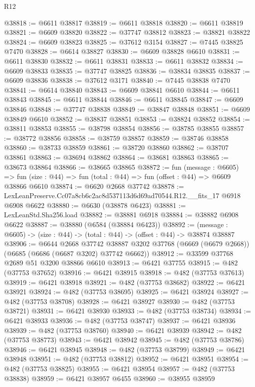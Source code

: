 \begin{lexlean}{R12}
\begin{coremodule}
@38818 := @6611 @38817
@38819 := @6611 @38818
@38820 := @6611 @38819
@38821 := @6609 @38820
@38822 := @37747 @38812
@38823 := @38821 @38822
@38824 := @6609 @38823
@38825 := @37612 @3154
@38827 := @7445 @38825 @7470
@38828 := @6614 @38827
@38830 := @6609 @38828 @6610
@38831 := @6611 @38830
@38832 := @6611 @38831
@38833 := @6611 @38832
@38834 := @6609 @38833
@38835 := @37747 @38825
@38836 := @38834 @38835
@38837 := @6609 @38836
@38838 := @37612 @3171
@38840 := @7445 @38838 @7470
@38841 := @6614 @38840
@38843 := @6609 @38841 @6610
@38844 := @6611 @38843
@38845 := @6611 @38844
@38846 := @6611 @38845
@38847 := @6609 @38846
@38848 := @37747 @38838
@38849 := @38847 @38848
@38851 := @6609 @38849 @6610
@38852 := @38837 @38851
@38853 := @38824 @38852
@38854 := @38811 @38853
@38855 := @38798 @38854
@38856 := @38785 @38855
@38857 := @38772 @38856
@38858 := @38759 @38857
@38859 := @38746 @38858
@38860 := @38733 @38859
@38861 := @38720 @38860
@38862 := @38707 @38861
@38863 := @38694 @38862
@38864 := @38681 @38863
@38865 := @38673 @38864
@38866 := @38665 @38865
@38872 := fun (message : @6605) =>
  fun (size : @44) => fun (total : @44) => fun (offset : @44) => @6609 @38866 @6610
@38874 := @6620 @2668 @37742
@38878 := LexLeanPreserve.Cc07a8cb6c2ac8d537113d6d69ad70544.R12.__fits_17 @6918 @6908 @6622
@38880 := @6630 (@38878 @6423)
@38881 := LexLeanStd.Sha256.load
@38882 := @38881 @6918
@38884 := @38882 @6908 @6622
@38887 := @38880 (@6584 (@38884 @6423))
@38892 := (message : @6605) -> (size : @44) -> (total : @44) -> (offset : @44) -> @38874 @38887
@38906 := @6644
    @2668
    @37742
    @38887
    @3202
    @37768
    (@6669 (@6679 @2668))
    (@6685 (@6686 (@6687 @3202) @37742 @6662))
@38912 := @33599 @37768 @2689 @51 @3200 @38866 @6610
@38913 := @6421 @37755
@38915 := @482 (@37753 @37652)
@38916 := @6421 @38915
@38918 := @482 (@37753 @37613)
@38919 := @6421 @38918
@38921 := @482 (@37753 @38682)
@38922 := @6421 @38921
@38924 := @482 (@37753 @38695)
@38925 := @6421 @38924
@38927 := @482 (@37753 @38708)
@38928 := @6421 @38927
@38930 := @482 (@37753 @38721)
@38931 := @6421 @38930
@38933 := @482 (@37753 @38734)
@38934 := @6421 @38933
@38936 := @482 (@37753 @38747)
@38937 := @6421 @38936
@38939 := @482 (@37753 @38760)
@38940 := @6421 @38939
@38942 := @482 (@37753 @38773)
@38943 := @6421 @38942
@38945 := @482 (@37753 @38786)
@38946 := @6421 @38945
@38948 := @482 (@37753 @38799)
@38949 := @6421 @38948
@38951 := @482 (@37753 @38812)
@38952 := @6421 @38951
@38954 := @482 (@37753 @38825)
@38955 := @6421 @38954
@38957 := @482 (@37753 @38838)
@38959 := @6421 @38957 @6455
@38960 := @38955 @38959

\end{coremodule}
\end{lexlean}
